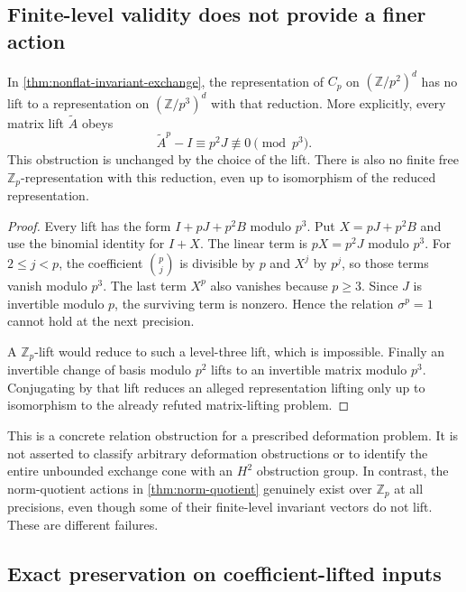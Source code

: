 \subsection{Finite-level validity does not provide a finer action}

\begin{theorem}\label{thm:one-step-group-lift}
In \cref{thm:nonflat-invariant-exchange}, the representation of $C_p$ on $(\mathbb Z/p^2)^d$ has no lift to a representation on $(\mathbb Z/p^3)^d$ with that reduction. More explicitly, every matrix lift $\widetilde A$ obeys
\[
 \boxed{\widetilde A^p-I\equiv p^2J\not\equiv0\pmod{p^3}.}
\]
This obstruction is unchanged by the choice of the lift. There is also no finite free $\mathbb Z_p$-representation with this reduction, even up to isomorphism of the reduced representation.
\end{theorem}
\begin{proof}
Every lift has the form $I+pJ+p^2B$ modulo $p^3$. Put $X=pJ+p^2B$ and use the binomial identity for $I+X$. The linear term is $pX=p^2J$ modulo $p^3$. For $2\leq j<p$, the coefficient $\binom pj$ is divisible by $p$ and $X^j$ by $p^j$, so those terms vanish modulo $p^3$. The last term $X^p$ also vanishes because $p\geq3$. Since $J$ is invertible modulo $p$, the surviving term is nonzero. Hence the relation $\sigma^p=1$ cannot hold at the next precision.

A $\mathbb Z_p$-lift would reduce to such a level-three lift, which is impossible. Finally an invertible change of basis modulo $p^2$ lifts to an invertible matrix modulo $p^3$. Conjugating by that lift reduces an alleged representation lifting only up to isomorphism to the already refuted matrix-lifting problem.
\end{proof}

This is a concrete relation obstruction for a prescribed deformation problem. It is not asserted to classify arbitrary deformation obstructions or to identify the entire unbounded exchange cone with an $H^2$ obstruction group. In contrast, the norm-quotient actions in \cref{thm:norm-quotient} genuinely exist over $\mathbb Z_p$ at all precisions, even though some of their finite-level invariant vectors do not lift. These are different failures.


\subsection{Exact preservation on coefficient-lifted inputs}


